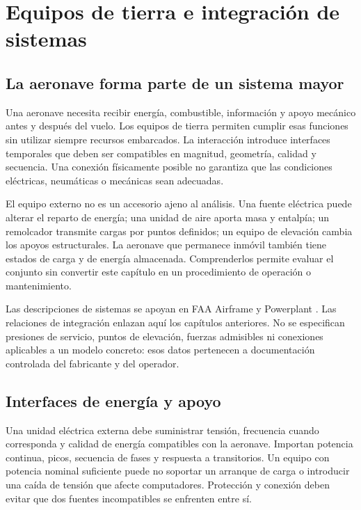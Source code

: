 \chapter{Equipos de tierra e integración de sistemas}\label{ch:25}

\section{La aeronave forma parte de un sistema mayor}
Una aeronave necesita recibir energía, combustible, información y apoyo mecánico antes y después del vuelo. Los equipos de tierra permiten cumplir esas funciones sin utilizar siempre recursos embarcados. La interacción introduce interfaces temporales que deben ser compatibles en magnitud, geometría, calidad y secuencia. Una conexión físicamente posible no garantiza que las condiciones eléctricas, neumáticas o mecánicas sean adecuadas.

El equipo externo no es un accesorio ajeno al análisis. Una fuente eléctrica puede alterar el reparto de energía; una unidad de aire aporta masa y entalpía; un remolcador transmite cargas por puntos definidos; un equipo de elevación cambia los apoyos estructurales. La aeronave que permanece inmóvil también tiene estados de carga y de energía almacenada. Comprenderlos permite evaluar el conjunto sin convertir este capítulo en un procedimiento de operación o mantenimiento.

Las descripciones de sistemas se apoyan en FAA Airframe y Powerplant \cite{FAA-AIRFRAME,FAA-POWERPLANT}. Las relaciones de integración enlazan aquí los capítulos anteriores. No se especifican presiones de servicio, puntos de elevación, fuerzas admisibles ni conexiones aplicables a un modelo concreto: esos datos pertenecen a documentación controlada del fabricante y del operador.


\section{Interfaces de energía y apoyo}
Una unidad eléctrica externa debe suministrar tensión, frecuencia cuando corresponda y calidad de energía compatibles con la aeronave. Importan potencia continua, picos, secuencia de fases y respuesta a transitorios. Un equipo con potencia nominal suficiente puede no soportar un arranque de carga o introducir una caída de tensión que afecte computadores. Protección y conexión deben evitar que dos fuentes incompatibles se enfrenten entre sí.

